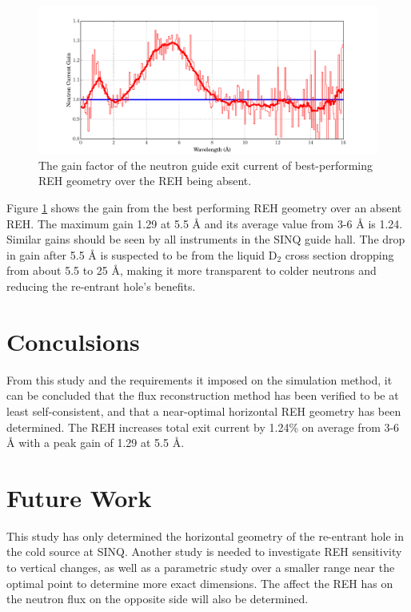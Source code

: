 \documentclass[a4paper]{jpconf}
\begin{document}
\begin{figure}
\begin{center}
\includegraphics[scale=0.38,trim={0cm 0cm 0cm 0cm},clip]{graphics/parametric_gain.pdf}
\end{center}
\caption{\label{parametric_gain}The gain factor of the neutron guide exit current of best-performing REH geometry over the REH being absent.}
\end{figure}


Figure \ref{parametric_gain} shows the gain from the best performing REH geometry over an absent REH.  The maximum gain 1.29 at 5.5 \AA{} and its average value from 3-6 \AA{} is 1.24.  Similar gains should be seen by all instruments in the SINQ guide hall.  The drop in gain after 5.5 \AA{} is suspected to be from the liquid D$_2$ cross section dropping from about 5.5 to 25 \AA{}, making it more transparent to colder neutrons and reducing the re-entrant hole's benefits.


\section{Conculsions}

From this study and the requirements it imposed on the simulation method, it can be concluded that the flux reconstruction method has been verified to be at least self-consistent, and that a near-optimal horizontal REH geometry has been determined.  The REH increases total exit current by 1.24\% on average from 3-6 \AA{} with a peak gain of 1.29 at 5.5 \AA{}.

\section{Future Work}

This study has only determined the horizontal geometry of the re-entrant hole in the cold source at SINQ.  Another study is needed to investigate REH sensitivity to vertical changes, as well as a parametric study over a smaller range near the optimal point to determine more exact dimensions.  The affect the REH has on the neutron flux on the opposite side will also be determined.
\end{document}
